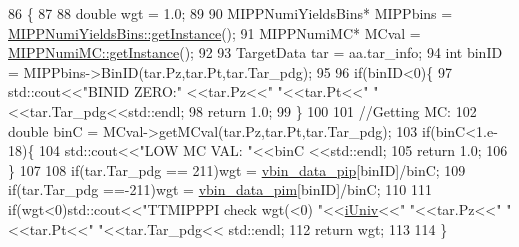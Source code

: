 \begin{DoxyCode}
86                                                                                     \{
87     
88     \textcolor{keywordtype}{double} wgt = 1.0;
89     
90     MIPPNumiYieldsBins*  MIPPbins =  \hyperlink{class_neutrino_flux_reweight_1_1_m_i_p_p_numi_yields_bins_a7f44afe90a846812d6eabfafa8f576e4}{MIPPNumiYieldsBins::getInstance}();
91     MIPPNumiMC*  MCval =  \hyperlink{class_neutrino_flux_reweight_1_1_m_i_p_p_numi_m_c_a4324da8640cc9a0d157d82e08da3a1c3}{MIPPNumiMC::getInstance}();    
92     
93     TargetData tar = aa.tar\_info;
94     \textcolor{keywordtype}{int} binID = MIPPbins->BinID(tar.Pz,tar.Pt,tar.Tar\_pdg);
95     
96     \textcolor{keywordflow}{if}(binID<0)\{
97       std::cout<<\textcolor{stringliteral}{"BINID ZERO:"} <<tar.Pz<<\textcolor{stringliteral}{" "}<<tar.Pt<<\textcolor{stringliteral}{" "} <<tar.Tar\_pdg<<std::endl;
98       \textcolor{keywordflow}{return} 1.0;
99     \}
100     
101     \textcolor{comment}{//Getting MC:}
102     \textcolor{keywordtype}{double} binC = MCval->getMCval(tar.Pz,tar.Pt,tar.Tar\_pdg);
103     \textcolor{keywordflow}{if}(binC<1.e-18)\{
104       std::cout<<\textcolor{stringliteral}{"LOW MC VAL: "}<<binC <<std::endl;
105       \textcolor{keywordflow}{return} 1.0;
106     \}
107     
108     \textcolor{keywordflow}{if}(tar.Tar\_pdg == 211)wgt = \hyperlink{class_neutrino_flux_reweight_1_1_m_i_p_p_numi_pion_yields_reweighter_a2120bbeea3e8b080eb68cd8ef6aa5b8e}{vbin\_data\_pip}[binID]/binC;
109     \textcolor{keywordflow}{if}(tar.Tar\_pdg ==-211)wgt = \hyperlink{class_neutrino_flux_reweight_1_1_m_i_p_p_numi_pion_yields_reweighter_a812702b4afdcb56925d897e56a01b352}{vbin\_data\_pim}[binID]/binC;
110     
111     \textcolor{keywordflow}{if}(wgt<0)std::cout<<\textcolor{stringliteral}{"TTMIPPPI check wgt(<0) "}<<\hyperlink{class_neutrino_flux_reweight_1_1_m_i_p_p_numi_pion_yields_reweighter_a1ff57841eaa437aeb11a9793a64e47c2}{iUniv}<<\textcolor{stringliteral}{" "}<<tar.Pz<<\textcolor{stringliteral}{" "}<<tar.Pt<<\textcolor{stringliteral}{" "}<<tar.Tar\_pdg<<
      std::endl;
112     \textcolor{keywordflow}{return} wgt;
113     
114   \}
\end{DoxyCode}
